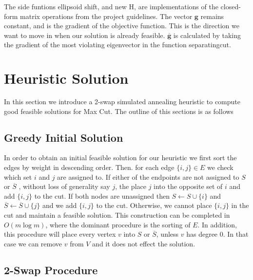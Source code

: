 \documentclass[12pt]{article}
\theoremstyle{plain}
\theoremstyle{definition}
\begin{document}
The side funtions ellipsoid shift, and new H, are implementations of the closed-form matrix operations from the project guidelines. The vector $\mathbf{g}$ remains constant, and is the gradient of the objective function. This is the direction we want to move in when our solution is already feasible. $\overline{\mathbf{g}}$ is calculated by taking the gradient of the most violating eigenvector in the function separatingcut.

\section{Heuristic Solution}

In this section we introduce a 2-swap simulated annealing heuristic to compute good feasible solutions for Max Cut. The outline of this sections is as follows

\subsection{Greedy Initial Solution}

In order to obtain an initial feasible solution for our heuristic we first sort the edges by weight in descending order. Then. for each edge $\lbrace i,j \rbrace \in E$ we check which set $i$ and $j$ are assigned to. If either of the endpoints are not assigned to $S$ or $\overline{S}$ , without loss of generality say $j$, the place $j$ into the opposite set of $i$ and add $\lbrace i,j \rbrace$ to the cut. If both nodes are unassigned then $S \gets S \cup \lbrace i \rbrace$ and $\overline{S} \gets \overline{S} \cup \lbrace j \rbrace$ and we add $\lbrace i,j \rbrace$ to the cut. Otherwise, we cannot place $\lbrace i,j \rbrace$ in the cut and maintain a feasible solution. This construction can be completed in $O(m \log m)$, where the dominant procedure is the sorting of $E$. In addition, this procedure will place every vertex $v$ into $S$ or $\overline{S}$, unless $v$ has degree 0. In that case we can remove $v$ from $V$ and it does not effect the solution.

\subsection{2-Swap Procedure}
\end{document}
